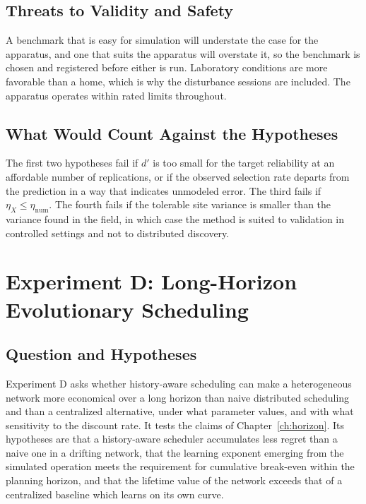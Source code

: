 \subsection*{Threats to Validity and Safety}

A benchmark that is easy for simulation will understate the case for the apparatus, and one that suits the apparatus will overstate it, so the benchmark is chosen and registered before either is run. Laboratory conditions are more favorable than a home, which is why the disturbance sessions are included. The apparatus operates within rated limits throughout.

\subsection*{What Would Count Against the Hypotheses}

The first two hypotheses fail if $d'$ is too small for the target reliability at an affordable number of replications, or if the observed selection rate departs from the prediction in a way that indicates unmodeled error. The third fails if $\eta_X\le\eta_{\mathrm{num}}$. The fourth fails if the tolerable site variance is smaller than the variance found in the field, in which case the method is suited to validation in controlled settings and not to distributed discovery.

\section{Experiment D: Long-Horizon Evolutionary Scheduling}

\subsection*{Question and Hypotheses}

Experiment D asks whether history-aware scheduling can make a heterogeneous network more economical over a long horizon than naive distributed scheduling and than a centralized alternative, under what parameter values, and with what sensitivity to the discount rate. It tests the claims of Chapter~\ref{ch:horizon}. Its hypotheses are that a history-aware scheduler accumulates less regret than a naive one in a drifting network, that the learning exponent emerging from the simulated operation meets the requirement for cumulative break-even within the planning horizon, and that the lifetime value of the network exceeds that of a centralized baseline which learns on its own curve.

